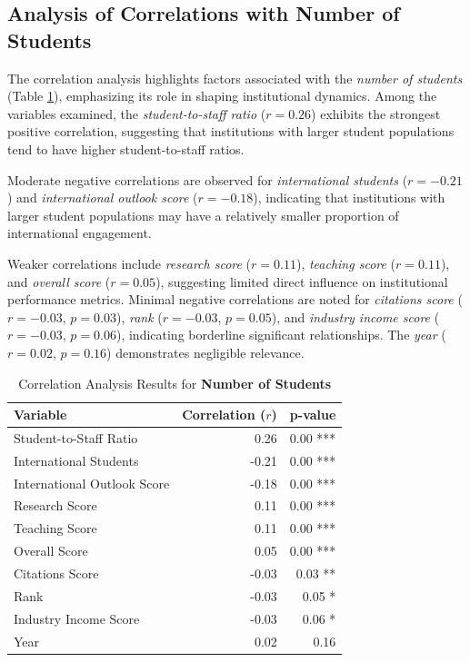 \documentclass[conference]{IEEEtran}
\begin{document}
\subsection{Analysis of Correlations with Number of Students}

The correlation analysis highlights factors associated with the \textit{number of students} (Table \ref{tab:correlation_number_students}), emphasizing its role in shaping institutional dynamics. Among the variables examined, the \textit{student-to-staff ratio} ($r = 0.26$) exhibits the strongest positive correlation, suggesting that institutions with larger student populations tend to have higher student-to-staff ratios.

Moderate negative correlations are observed for \textit{international students} ($r = -0.21$) and \textit{international outlook score} ($r = -0.18$), indicating that institutions with larger student populations may have a relatively smaller proportion of international engagement. 

Weaker correlations include \textit{research score} ($r = 0.11$), \textit{teaching score} ($r = 0.11$), and \textit{overall score} ($r = 0.05$), suggesting limited direct influence on institutional performance metrics. Minimal negative correlations are noted for \textit{citations score} ($r = -0.03$, $p = 0.03$), \textit{rank} ($r = -0.03$, $p = 0.05$), and \textit{industry income score} ($r = -0.03$, $p = 0.06$), indicating borderline significant relationships. The \textit{year} ($r = 0.02$, $p = 0.16$) demonstrates negligible relevance.

\begin{table}[h!]
	\centering
	\caption{Correlation Analysis Results for \textbf{Number of Students}}
	\label{tab:correlation_number_students}
	\begin{tabular}{|l|r|r|}
		\hline
		\textbf{Variable} & \textbf{Correlation ($r$)} & \textbf{p-value} \\
		\hline
		Student-to-Staff Ratio & 0.26 & 0.00 *** \\
		International Students & -0.21 & 0.00 *** \\
		International Outlook Score & -0.18 & 0.00 *** \\
		Research Score & 0.11 & 0.00 *** \\
		Teaching Score & 0.11 & 0.00 *** \\
		Overall Score & 0.05 & 0.00 *** \\
		Citations Score & -0.03 & 0.03 ** \\
		Rank & -0.03 & 0.05 * \\
		Industry Income Score & -0.03 & 0.06 * \\
		Year & 0.02 & 0.16 \\
		\hline
	\end{tabular}
\end{table}
\end{document}
